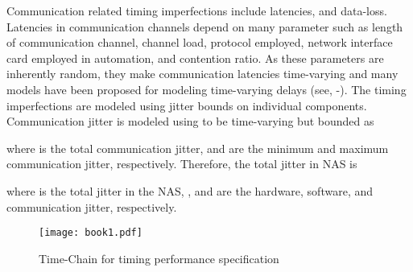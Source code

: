 \documentclass[letterpaper, 10 pt, conference]{ieeeconf}
\begin{document}
Communication related timing imperfections include latencies, and data-loss. Latencies in communication channels depend on many parameter such as length of communication channel, channel load, protocol employed, network interface card employed in automation, and contention ratio. As these parameters are inherently random, they make communication latencies time-varying and many models have been proposed for modeling time-varying delays (see, \cite{SeshThe}-\cite{Nilson}). The timing imperfections are modeled using jitter bounds on individual components. Communication jitter is modeled using to be time-varying but bounded as

where  is the total communication jitter,  and  are the minimum and maximum communication jitter, respectively. Therefore, the total jitter in NAS is

where  is the total jitter in the NAS, , and  are the hardware, software, and communication jitter, respectively. 
\begin{figure}[h]
\centering
\texttt{[image: book1.pdf]}
\caption{Time-Chain for timing performance specification}
\label{fig:timechain}
\end{figure}
\end{document}
